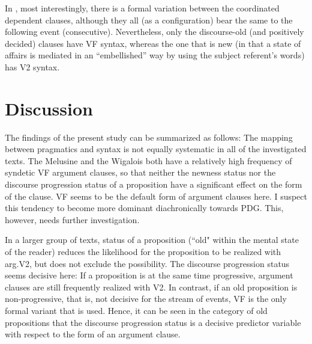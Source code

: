 \documentclass[output=paper,colorlinks,citecolor=brown]{langscibook}
\begin{document}
In , most interestingly, there is a formal variation between the coordinated dependent clauses, although they all (as a configuration) bear the same  to the following event (consecutive). Nevertheless, only the discourse-old (and positively decided) clauses have VF syntax, whereas the one that is new (in that a state of affairs is mediated in an “embellished” way by using the subject referent's words) has V2 syntax.


\section{Discussion}\label{sec:reetz:6}
The findings of the present study can be summarized as follows: The mapping between pragmatics and syntax is not equally systematic in all of the investigated texts. The Melusine and the Wigalois both have a relatively high frequency of syndetic VF argument clauses, so that neither the newness status nor the discourse progression status of a proposition have a significant effect on the form of the clause. VF seems to be the default form of argument clauses here. I suspect this tendency to become more dominant diachronically towards PDG. This, however, needs further investigation.

In a larger group of texts,  status of a proposition (“old" within the mental state of the reader) reduces the likelihood for the proposition to be realized with arg.V2, but does not exclude the possibility. The discourse progression status seems decisive here: If a  proposition is at the same time progressive, argument clauses are still frequently realized with V2. In contrast, if an old proposition is non-progressive, that is, not decisive for the stream of events, VF is the only formal variant that is used. Hence, it can be seen in the category of old propositions that the discourse progression status is a decisive predictor variable with respect to the form of an argument clause. 
\end{document}
